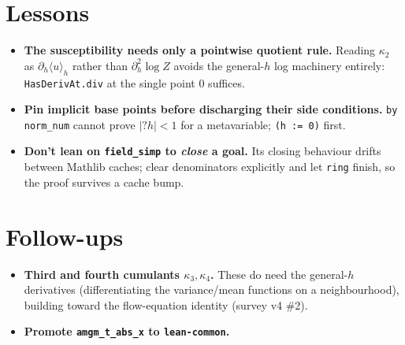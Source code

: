 \documentclass[11pt]{article}
\begin{document}
\section{Lessons}

\begin{itemize}[itemsep=3pt]
\item \textbf{The susceptibility needs only a pointwise quotient rule.}
  Reading $\kappa_2$ as $\partial_h\langle u\rangle_h$ rather than
  $\partial_h^2\log Z$ avoids the general-$h$ log machinery entirely:
  \texttt{HasDerivAt.div} at the single point $0$ suffices.
\item \textbf{Pin implicit base points before discharging their side
  conditions.} \texttt{by norm\_num} cannot prove $|?h|<1$ for a
  metavariable; \texttt{(h := 0)} first.
\item \textbf{Don't lean on \texttt{field\_simp} to \emph{close} a goal.}
  Its closing behaviour drifts between Mathlib caches; clear denominators
  explicitly and let \texttt{ring} finish, so the proof survives a cache bump.
\end{itemize}

\section{Follow-ups}

\begin{itemize}[itemsep=3pt]
\item \textbf{Third and fourth cumulants $\kappa_3,\kappa_4$.} These do need
  the general-$h$ derivatives (differentiating the variance/mean functions on
  a neighbourhood), building toward the flow-equation identity (survey v4 \#2).
\item \textbf{Promote \texttt{amgm\_t\_abs\_x} to \texttt{lean-common}.}
\end{itemize}
\end{document}
